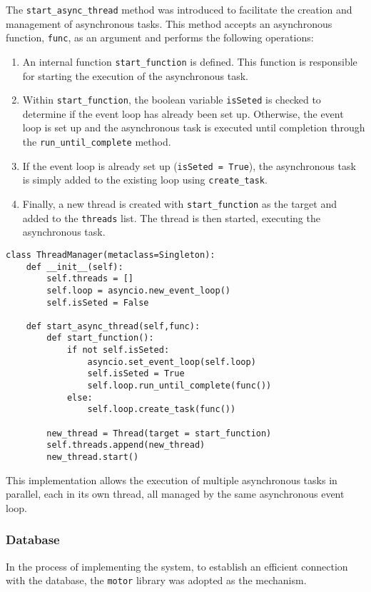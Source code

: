The \texttt{start\_async\_thread} method was introduced to facilitate the creation and management of asynchronous tasks. This method accepts an asynchronous function, \texttt{func}, as an argument and performs the following operations:

\begin{enumerate}
    \item An internal function \texttt{start\_function} is defined. This function is responsible for starting the execution of the asynchronous task.
    \item Within \texttt{start\_function}, the boolean variable \texttt{isSeted} is checked to determine if the event loop has already been set up. Otherwise, the event loop is set up and the asynchronous task is executed until completion through the \texttt{run\_until\_complete} method.
    \item If the event loop is already set up (\texttt{isSeted = True}), the asynchronous task is simply added to the existing loop using \texttt{create\_task}.
    \item Finally, a new thread is created with \texttt{start\_function} as the target and added to the \texttt{threads} list. The thread is then started, executing the asynchronous task.
\end{enumerate}

\begin{Verbatim}[fontsize=\small, baselinestretch=0.6]
class ThreadManager(metaclass=Singleton):
    def __init__(self):
        self.threads = []
        self.loop = asyncio.new_event_loop()
        self.isSeted = False

    def start_async_thread(self,func):
        def start_function():
            if not self.isSeted:
                asyncio.set_event_loop(self.loop)
                self.isSeted = True
                self.loop.run_until_complete(func())
            else:
                self.loop.create_task(func())

        new_thread = Thread(target = start_function)
        self.threads.append(new_thread)
        new_thread.start()
\end{Verbatim}

This implementation allows the execution of multiple asynchronous tasks in parallel, each in its own thread, all managed by the same asynchronous event loop.

\subsubsection{Database}\label{subsubsec:DatabaseImpl}
In the process of implementing the system, to establish an efficient connection with the database, the \texttt{motor} library \cite{motorDocs} was adopted as the mechanism.

